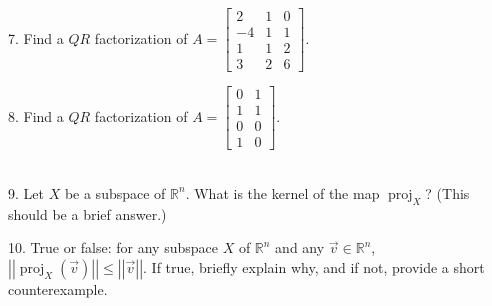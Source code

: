 \documentclass{article}
\begin{document}
7. Find a $QR$ factorization of $A = \left[\begin{array}{ccc} 2& 1& 0 \\ -4& 1& 1 \\ 1& 1& 2 \\ 3& 2& 6 \end{array}\right]$.

8. Find a $QR$ factorization of $A = \left[\begin{array}{cc} 0& 1 \\ 1& 1 \\ 0& 0 \\ 1& 0 \end{array}\right]$.

~\\

9. Let $X$ be a subspace of $\mathbb{R}^n$. What is the kernel of the map $\operatorname{proj}_X$? (This should be a brief answer.)

10. True or false: for any subspace $X$ of $\mathbb{R}^n$ and any $\vec{v} \in \mathbb{R}^n$, $\left| \left| \operatorname{proj}_X\left( \vec{v} \right) \right| \right| \leq \left| \left| \vec{v} \right| \right|$. If true, briefly explain why, and if not, provide a short counterexample.
\end{document}
